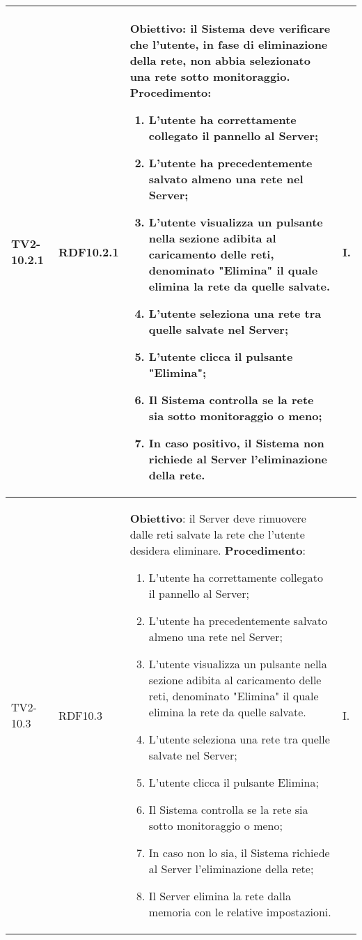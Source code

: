 \begin{longtable}{|C{.15\textwidth}|C{.13\textwidth}|m{.52\textwidth}|C{.08\textwidth}|}
TV2-10.2.1 & RDF10.2.1 &
	\textbf{Obiettivo}: il Sistema deve verificare che l'utente, in fase di eliminazione della rete, non abbia selezionato una rete sotto monitoraggio. \newline
	\textbf{Procedimento}:
	\begin{enumerate}
		\item L'utente ha correttamente collegato il pannello al Server;
		\item L'utente ha precedentemente salvato almeno una rete nel Server;
		\item L'utente visualizza un pulsante nella sezione adibita al caricamento delle reti, denominato "Elimina" il quale elimina la rete da quelle salvate.
		\item L'utente seleziona una rete tra quelle salvate nel Server;
		\item L'utente clicca il pulsante "Elimina";
		\item Il Sistema controlla se la rete sia sotto monitoraggio o meno;
		\item In caso positivo, il Sistema non richiede al Server l'eliminazione della rete.
	\end{enumerate}
	& I. \\
\hline

TV2-10.3 & RDF10.3 &
	\textbf{Obiettivo}: il Server deve rimuovere dalle reti salvate la rete che l'utente desidera eliminare. \newline
	\textbf{Procedimento}:
	\begin{enumerate}
		\item L'utente ha correttamente collegato il pannello al Server;
		\item L'utente ha precedentemente salvato almeno una rete nel Server;
		\item L'utente visualizza un pulsante nella sezione adibita al caricamento delle reti, denominato "Elimina" il quale elimina la rete da quelle salvate.
		\item L'utente seleziona una rete tra quelle salvate nel Server;
		\item L'utente clicca il pulsante Elimina;
		\item Il Sistema controlla se la rete sia sotto monitoraggio o meno;
		\item In caso non lo sia, il Sistema richiede al Server l'eliminazione della rete;
		\item Il Server elimina la rete dalla memoria con le relative impostazioni.
	\end{enumerate}
	& I. \\
\hline


\end{longtable}
